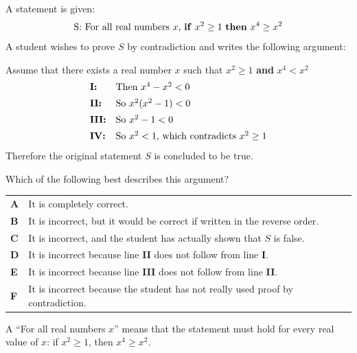 \documentclass[11pt,a4paper]{article}
\begin{document}
\begin{enumerate}[label=\textbf{\arabic*.},leftmargin=*,itemsep=0pt,start=17]
A statement is given: \[\text{S: For all real numbers $x$, \textbf{if} $x^2 \ge 1$ \textbf{then} $x^4 \ge x^2$}\] A student wishes to prove $S$ by contradiction and writes the following argument:

Assume that there exists a real number $x$ such that $x^2 \ge 1$ \textbf{and} $x^4 < x^2$ \[ \begin{array}{@{}l l@{}}
\textbf{I:} & \text{Then $x^4 - x^2 < 0$} \\[5pt]
\textbf{II:} & \text{So $x^2(x^2 - 1) < 0$} \\[5pt]
\textbf{III:} & \text{So $x^2 - 1 < 0$} \\[5pt]
\textbf{IV:} & \text{So $x^2 < 1$, which contradicts $x^2 \ge 1$}
\end{array} \] Therefore the original statement $S$ is concluded to be true.

Which of the following best describes this argument?

\par\vspace*{12pt}
\begin{tabularx}{\linewidth}{@{}>{\bfseries}l Y@{}}
A &
It is completely correct.
\\[0.8em]
B &
It is incorrect, but it would be correct if written in the reverse order.
\\[0.8em]
C &
It is incorrect, and the student has actually shown that $S$ is false.
\\[0.8em]
D &
It is incorrect because line \textbf{II} does not follow from line \textbf{I}.
\\[0.8em]
E &
It is incorrect because line \textbf{III} does not follow from line \textbf{II}.
\\[0.8em]
F &
It is incorrect because the student has not really used proof by contradiction.
\\
\end{tabularx}

\begin{djsSolution}{A}
``For all real numbers $x$'' means that the statement must hold for every real value of $x$: if $x^2\ge1$, then $x^4\ge x^2$.


\end{djsSolution}
\end{enumerate}
\end{document}
